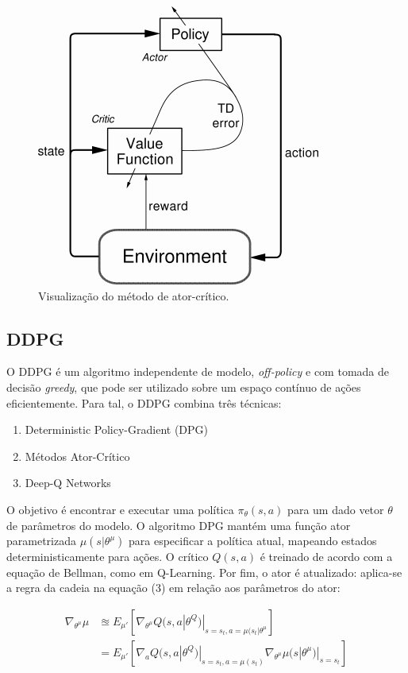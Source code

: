 \documentclass[twoside,conference,a4paper]{IEEEtran}
\begin{document}
\begin{figure}[ht!]
  \centering
  \includegraphics[width=0.7\hsize]{figuras/actor-critic.png}
  \caption{Visualização do método de ator-crítico.}
  \label{fig:actor}
\end{figure}

\subsection{DDPG}

O DDPG é um algoritmo independente de modelo, \textit{off-policy} e com tomada de decisão \textit{greedy}, que pode ser utilizado sobre um espaço contínuo de ações eficientemente. Para tal, o DDPG combina três técnicas: 

\begin{enumerate}  
\item Deterministic Policy-Gradient (DPG) \cite{Silver:2014}
\item Métodos Ator-Crítico 
\item Deep-Q Networks 
\end{enumerate}

O objetivo é encontrar e executar uma política $\pi_{\theta}(s,a)$ para um dado vetor $\theta$ de parâmetros do modelo. O algoritmo DPG mantém uma função ator parametrizada $\mu(s|\theta^{\mu})$ para especificar a política atual, mapeando estados deterministicamente para ações. O crítico $Q(s,a)$ é treinado de acordo com a equação de Bellman, como em Q-Learning. Por fim, o ator é atualizado: aplica-se a regra da cadeia na equação (3) em relação aos parâmetros do ator:

\begin{equation}
\begin{split}
\nabla_{\theta^{\mu}}\mu & \approxeq E_{\mu'}[\nabla_{\theta^{\mu}}Q(s,a|\theta^Q)|_{s = s_t, a = \mu(s_t|\theta^{\mu}}] \\
& = E_{\mu'}[\nabla_{a}Q(s,a|\theta^Q)|_{s = s_t, a = \mu(s_t)}\nabla_{\theta^{\mu}}\mu(s|\theta^{\mu})|_{s = s_t}]
\end{split}
\end{equation}
\end{document}
